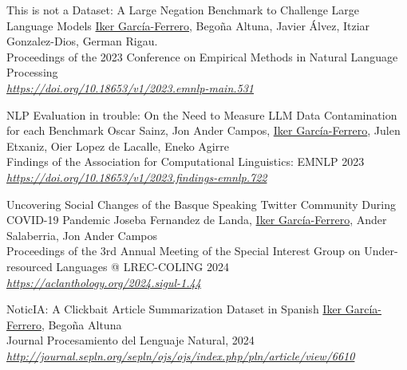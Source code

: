 \begin{not_part_of_the_thesis}{	
    This is not a Dataset: A Large Negation Benchmark to Challenge Large Language Models}
    \underline{Iker García-Ferrero}, Begoña Altuna, Javier Álvez, Itziar Gonzalez-Dios, German Rigau. \\
    Proceedings of the 2023 Conference on Empirical Methods in Natural Language Processing \\
    \textit{\href{https://doi.org/10.18653/v1/2023.emnlp-main.531}{https://doi.org/10.18653/v1/2023.emnlp-main.531}}
\end{not_part_of_the_thesis}

\clearpage

\begin{not_part_of_the_thesis}{	
    NLP Evaluation in trouble: On the Need to Measure LLM Data Contamination for each Benchmark}
    Oscar Sainz, Jon Ander Campos, \underline{Iker García-Ferrero}, Julen Etxaniz, Oier Lopez de Lacalle, Eneko Agirre \\
    Findings of the Association for Computational Linguistics: EMNLP 2023 \\
    \textit{\href{https://doi.org/10.18653/v1/2023.findings-emnlp.722}{https://doi.org/10.18653/v1/2023.findings-emnlp.722}}
\end{not_part_of_the_thesis}

\begin{not_part_of_the_thesis}{	
    Uncovering Social Changes of the Basque Speaking Twitter Community During COVID-19 Pandemic}
    Joseba Fernandez de Landa, \underline{Iker García-Ferrero}, Ander Salaberria, Jon Ander Campos\\
    Proceedings of the 3rd Annual Meeting of the Special Interest Group on Under-resourced Languages @ LREC-COLING 2024 \\
    \textit{\href{https://aclanthology.org/2024.sigul-1.44}{https://aclanthology.org/2024.sigul-1.44}}
\end{not_part_of_the_thesis}

\begin{not_part_of_the_thesis}{	
    NoticIA: A Clickbait Article Summarization Dataset in Spanish}
    \underline{Iker García-Ferrero}, Begoña Altuna \\
    Journal Procesamiento del Lenguaje Natural, 2024 \\
    \textit{\href{http://journal.sepln.org/sepln/ojs/ojs/index.php/pln/article/view/6610}{http://journal.sepln.org/sepln/ojs/ojs/index.php/pln/article/view/6610}}
\end{not_part_of_the_thesis}

